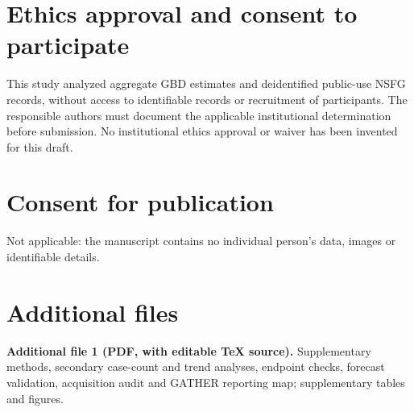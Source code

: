\documentclass[11pt,a4paper]{article}
\begin{document}
\section*{Ethics approval and consent to participate}
This study analyzed aggregate GBD estimates and deidentified public-use NSFG records, without access to identifiable records or recruitment of participants. The responsible authors must document the applicable institutional determination before submission. No institutional ethics approval or waiver has been invented for this draft.

\section*{Consent for publication}
Not applicable: the manuscript contains no individual person's data, images or identifiable details.

\section*{Additional files}
\textbf{Additional file 1 (PDF, with editable TeX source).} Supplementary methods, secondary case-count and trend analyses, endpoint checks, forecast validation, acquisition audit and GATHER reporting map; supplementary tables and figures.
\end{document}
